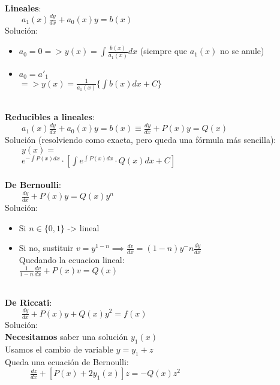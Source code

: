 \documentclass[a4paper,landscape,10pt]{cheatsheet}
\begin{document}
\hfill\\
\textbf{Lineales}:\\
$\qquad a_1(x)\frac{dy}{dx}+a_0(x)y=b(x)$\\
Solución:\\
\begin{itemize}
  \item $a_0=0 => y(x)=\int\frac{b(x)}{a_1(x)}dx$ (siempre que $a_1(x)$ no se anule)\\
  \item $a_0=a'_1 $\\$=> y(x)=\frac{1}{a_1(x)}\{\int b(x)dx+C\}$\\
\end{itemize}

\hfill\\
\textbf{Reducibles a lineales}:\\
$\qquad a_1(x)\frac{dy}{dx}+a_0(x)y=b(x) \equiv \frac{dy}{dx}+P(x)y=Q(x)$\\
Solución (resolviendo como exacta, pero queda una fórmula más sencilla):\\
$\qquad y(x)=$\\
$\qquad e^{-\int P(x)dx}\cdot\left[\int e^{\int P(x)dx}\cdot Q(x)dx + C\right]$\\

\hfill\\
\textbf{De Bernoulli}:\\
$\qquad \frac{dy}{dx}+P(x)y=Q(x)y^n$\\
Solución:\\
\begin{itemize}
  \item Si $n\in\{0,1\}$ -> lineal\\
  \item Si no, sustituir $v=y^{1-n} \implies \frac{dv}{dx}=(1-n)y^-n\frac{dy}{dx}$
        \\ Quedando la ecuacion lineal:
        \\$\frac{1}{1-n}\frac{dv}{dx}+P(x)v=Q(x)$
\end{itemize}

\hfill\\
\textbf{De Riccati}:\\
$\qquad \frac{dy}{dx}+P(x)y+Q(x)y^2=f(x)$\\
Solución:\\
\qquad\textbf{Necesitamos} saber una solución $y_1(x)$\\
\qquad Usamos el cambio de variable $y=y_1+z$\\
\qquad Queda una ecuación de Bernoulli: \\
$\qquad\quad \frac{dz}{dx}+\left[P(x)+2y_1(x)\right]z=-Q(x)z^2$\\
\end{document}
